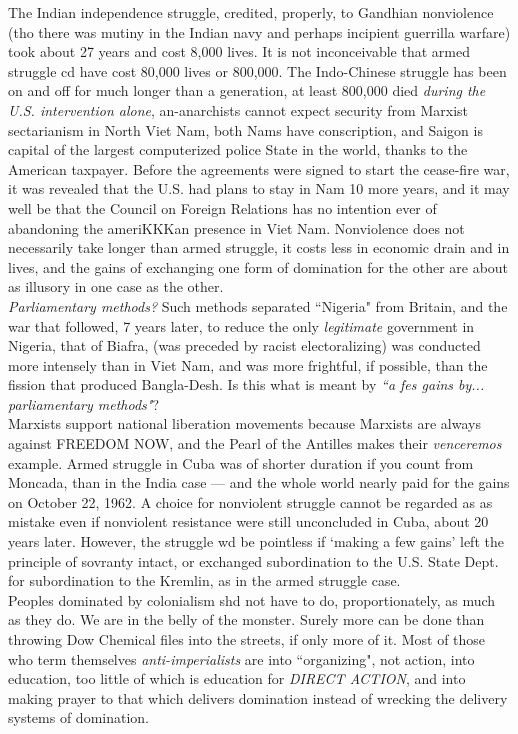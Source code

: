 \documentclass[12pt, onecolumn, letterpaper, oneside]{book}
\begin{document}
The Indian independence struggle, credited, properly, to Gandhian nonviolence (tho there was mutiny in the Indian navy and perhaps incipient guerrilla warfare) took about 27 years and cost 8,000 lives. It is not inconceivable that armed struggle cd have cost 80,000 lives or 800,000. The Indo-Chinese struggle has been on and off for much longer than a generation, at least 800,000 died \emph{during the U.S. intervention alone}, an-anarchists cannot expect security from Marxist sectarianism in North Viet Nam, both Nams have conscription, and Saigon is capital of the largest computerized police State in the world, thanks to the American taxpayer. Before the agreements were signed to start the cease-fire war, it was revealed that the U.S. had plans to stay in Nam 10 more years, and it may well be that the Council on Foreign Relations has no intention ever of abandoning the ameriKKKan presence in Viet Nam. Nonviolence does not necessarily take longer than armed struggle, it costs less in economic drain and in lives, and the gains of exchanging one form of domination for the other are about as illusory in one case as the other.\\
\emph{Parliamentary methods?} Such methods separated ``Nigeria" from Britain, and the war that followed, 7 years later, to reduce the only \emph{legitimate} government in Nigeria, that of Biafra, (was preceded by racist electoralizing) was conducted more intensely than in Viet Nam, and was more frightful, if possible, than the fission that produced Bangla-Desh. Is this what is meant by \emph{``a fes gains by... parliamentary methods"}?\\
Marxists support national liberation movements because Marxists are always against FREEDOM NOW, and the Pearl of the Antilles makes their \emph{venceremos} example. Armed struggle in Cuba was of shorter duration if you count from Moncada, than in the India case --- and the whole world nearly paid for the gains on October 22, 1962. A choice for nonviolent struggle cannot be regarded as as mistake even if nonviolent resistance were still unconcluded in Cuba, about 20 years later. However, the struggle wd be pointless if `making a few gains' left the principle of sovranty intact, or exchanged subordination to the U.S. State Dept. for subordination to the Kremlin, as in the armed struggle case.\\
Peoples dominated by colonialism shd not have to do, proportionately, as much as they do. We are in the belly of the monster. Surely more can be done than throwing Dow Chemical files into the streets, if only more of it. Most of those who term themselves \emph{anti-imperialists} are into ``organizing", not action, into education, too little of which is education for \emph{DIRECT ACTION}, and into making prayer to that which delivers domination instead of wrecking the delivery systems of domination.\\
\end{document}
